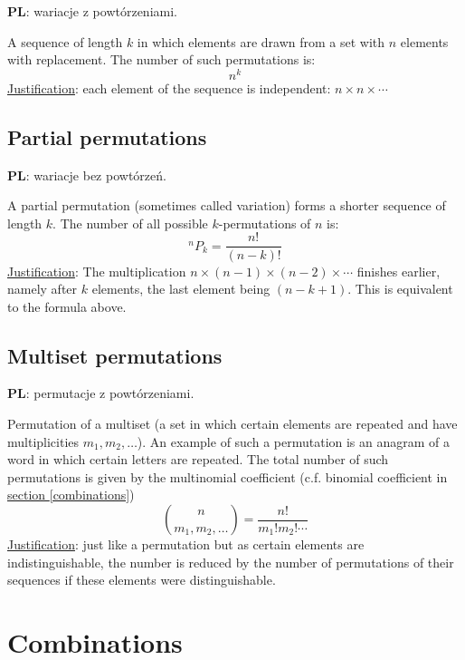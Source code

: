\documentclass{article}
\begin{document}
\textbf{PL}: wariacje z powtórzeniami.

A sequence of length $k$ in which elements are drawn from a set with $n$ elements with replacement.
The number of such permutations is:
\begin{equation}
    n^k
\end{equation}
\underline{Justification}: each element of the sequence is independent: $n\times n\times \dotsb$

\subsection{Partial permutations}

\textbf{PL}: wariacje bez powtórzeń.

A partial permutation (sometimes called variation) forms a shorter sequence of length $k$. 
The number of all possible $k$\nobreakdash-\hspace{0pt}permutations of $n$ is:
\begin{equation}
    ^nP_k = \frac{n!}{(n-k)!}
\end{equation}
\underline{Justification}: The multiplication ${n\times(n-1)\times(n-2)\times \dotsb}$  finishes earlier, namely after $k$ elements, the last element being $(n-k+1)$.
This is equivalent to the formula above.

\subsection{Multiset permutations}
\label{mulper}

\textbf{PL}: permutacje z powtórzeniami.

Permutation of a multiset (a set in which certain elements are repeated and have multiplicities $m_1, m_2, \dotsc$).
An example of such a permutation is an anagram of a word in which certain letters are repeated.
The total number of such permutations is given by the multinomial coefficient (c.f. binomial coefficient in \hyperref[combinations]{section \ref*{combinations}})
\begin{equation}
    \binom{n}{m_1, m_2, \dotsc} = \frac{n!}{m_1!m_2!\dotsm}
\end{equation}
\underline{Justification}: just like a permutation but as certain elements are indistinguishable, the number is reduced by the number of permutations of their sequences if these elements were distinguishable.

\section{Combinations}
\end{document}
